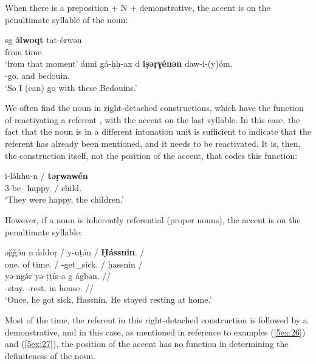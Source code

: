 \documentclass[output=paper]{langsci/langscibook}
\begin{document}
When there is a preposition + N + demonstrative, the accent is on the penultimate syllable of the noun:

\begin{exe}
\ex\label{5ex:28}
\gll	sg	{\bf{ə́lwoqt}}	tat-érwən \\
	from	time.{}	{} \\
\glt	`from that moment'
\ex\label{5ex:29}
\gll	ánni	gá-ḥḥ-ax	d	{\bf{iṣəṛɣénən}}	daw-i-(y)óm. \\
	{}	{}-go.{}	and	bedouin.{}	{} \\
\glt	`So I (can) go with these Bedouins.'
\end{exe}

We often find the noun in right-detached constructions, which have the function of reactivating a referent \citep[][280]{mettouchi:schiattarella:18}, with the accent on the last syllable. In this case, the fact that the noun is in a different intonation unit is sufficient to indicate that the referent has already been mentioned, and it needs to be reactivated. It is, then, the construction itself, not the position of the accent, that codes this function:

\begin{exe}
\ex\label{5ex:30}
\gll	i-lə́hhu-n	/	{\bf{təṛwawén}} \\
	3-be\_happy.{}	/	child.{} \\
\glt	`They were happy, the children.'
\end{exe}

However, if a noun is inherently referential (proper nouns), the accent is on the penultimate syllable:

\begin{exe}
\ex\label{5ex:31}
\gll	əǧǧə́n	n	áddoṛ	/	y-uṭə́n	/	{\bf{Ḥássnin}}.	/ \\
	one.{}	of	time.{}	/	{}-get\_sick.{}	/	ḥassnin	/ \\
\glt
\exi{}
\gll	yə-ngə́r	yə-ṭṭís-a	g	ágbən.	// \\
	{}-stay.{}	{}-rest.{}	in	house.{}	// \\
\glt	`Once, he got sick, Hassnin. He stayed resting at home.'
\end{exe}

Most of the time, the referent in this right-detached construction is followed by a demonstrative, and in this case, as mentioned in reference to examples (\ref{5ex:26}) and (\ref{5ex:27}), the position of the accent has no function in determining the definiteness of the noun.
\end{document}
